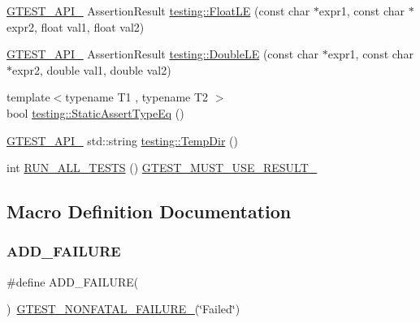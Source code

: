 \begin{DoxyCompactItemize}
\item 
\mbox{\hyperlink{_obj__test_2lib_2googletest-release-1_88_81_2googletest_2include_2gtest_2internal_2gtest-port_8h_aa73be6f0ba4a7456180a94904ce17790}{G\+T\+E\+S\+T\+\_\+\+A\+P\+I\+\_\+}} Assertion\+Result \mbox{\hyperlink{namespacetesting_a2c9a2a391c72a7b02ea3024586e33af0}{testing\+::\+Float\+LE}} (const char $\ast$expr1, const char $\ast$expr2, float val1, float val2)
\item 
\mbox{\hyperlink{_obj__test_2lib_2googletest-release-1_88_81_2googletest_2include_2gtest_2internal_2gtest-port_8h_aa73be6f0ba4a7456180a94904ce17790}{G\+T\+E\+S\+T\+\_\+\+A\+P\+I\+\_\+}} Assertion\+Result \mbox{\hyperlink{namespacetesting_ae10e2bb304b74abd1b06a2d912a8b43b}{testing\+::\+Double\+LE}} (const char $\ast$expr1, const char $\ast$expr2, double val1, double val2)
\item 
{\footnotesize template$<$typename T1 , typename T2 $>$ }\\bool \mbox{\hyperlink{namespacetesting_a661e70fc6afeb5c085eed3716aa45059}{testing\+::\+Static\+Assert\+Type\+Eq}} ()
\item 
\mbox{\hyperlink{_obj__test_2lib_2googletest-release-1_88_81_2googletest_2include_2gtest_2internal_2gtest-port_8h_aa73be6f0ba4a7456180a94904ce17790}{G\+T\+E\+S\+T\+\_\+\+A\+P\+I\+\_\+}} std\+::string \mbox{\hyperlink{namespacetesting_aae1bbe7c3cc99bf56263d51d3982a52e}{testing\+::\+Temp\+Dir}} ()
\item 
int \mbox{\hyperlink{_obj__test_2lib_2googletest-release-1_88_81_2googletest_2include_2gtest_2gtest_8h_a853a3792807489591d3d4a2f2ff9359f}{R\+U\+N\+\_\+\+A\+L\+L\+\_\+\+T\+E\+S\+TS}} () \mbox{\hyperlink{_obj__test_2lib_2googletest-release-1_88_81_2googletest_2include_2gtest_2internal_2gtest-port_8h_a8e5aab8276b2645f64f41c9e3021b935}{G\+T\+E\+S\+T\+\_\+\+M\+U\+S\+T\+\_\+\+U\+S\+E\+\_\+\+R\+E\+S\+U\+L\+T\+\_\+}}
\end{DoxyCompactItemize}


\subsection{Macro Definition Documentation}
\mbox{\label{_obj__test_2lib_2googletest-release-1_88_81_2googletest_2include_2gtest_2gtest_8h_adc16b5b0a740c39084ea5c9e960e3063}} 
\subsubsection{\texorpdfstring{ADD\_FAILURE}{ADD\_FAILURE}}
{\footnotesize\ttfamily \#define A\+D\+D\+\_\+\+F\+A\+I\+L\+U\+RE(\begin{DoxyParamCaption}{ }\end{DoxyParamCaption})~\mbox{\hyperlink{_obj__test_2lib_2googletest-release-1_88_81_2googletest_2include_2gtest_2internal_2gtest-internal_8h_a6cb7482cfa03661a91c698eb5895f642}{G\+T\+E\+S\+T\+\_\+\+N\+O\+N\+F\+A\+T\+A\+L\+\_\+\+F\+A\+I\+L\+U\+R\+E\+\_\+}}(\char`\"{}Failed\char`\"{})}

